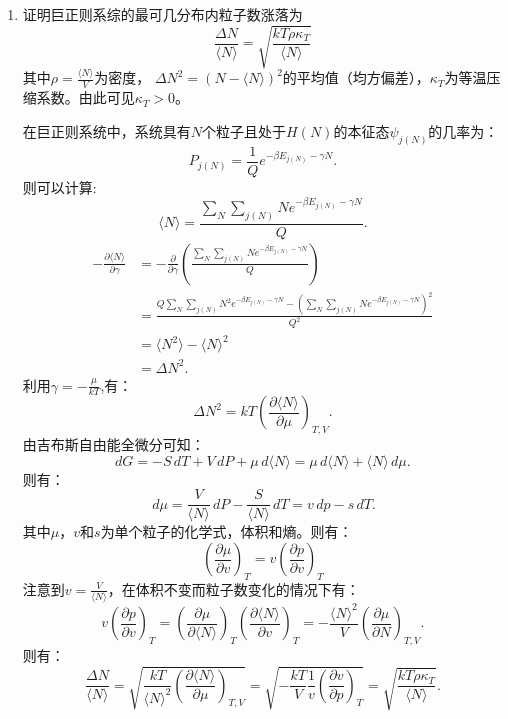 \documentclass[reqno,a4paper,12pt]{amsart}
\begin{document}
\begin{enumerate}[1]
	\item 证明巨正则系综的最可几分布内粒子数涨落为
	\[
		\frac{\Delta N}{\langle N \rangle} = \sqrt{\frac{kT\rho \kappa_T}{\langle N \rangle}}
	\]
	其中$\rho = \frac{\langle N \rangle}{V}$为密度， $\Delta N^2 = (N - \langle N \rangle)^2$的平均值（均方偏差），$\kappa_T$为等温压缩系数。由此可见$\kappa_T > 0$。
	\begin{tcolorbox}[breakable, colback = black!5!white, colframe = black]
	在巨正则系统中，系统具有$N$个粒子且处于$H(N)$的本征态$\psi_{j(N)}$的几率为：
	\[
		P_{j(N)} = \frac{1}{Q}e^{-\beta E_{j(N)} - \gamma N}.
	\]
	则可以计算:
	\[
		\langle N \rangle = \frac{\sum_N \sum_{j(N)} Ne^{-\beta E_{j(N)} - \gamma N}}{Q}.
	\]
	\begin{align*}
		-\frac{\partial \langle N \rangle}{\partial \gamma} &= -\frac{\partial }{\partial \gamma}\left( \frac{\sum_{N}\sum_{j(N)} Ne^{-\beta E_{j(N)} - \gamma N}}{Q} \right) \\
		&= \frac{Q\sum_N \sum_{j(N)} N^2e^{-\beta E_{j(N)} - \gamma N} - \left( \sum_N\sum_{j(N)} N e^{-\beta E_{j(N)} - \gamma N} \right)^2}{Q^2} \\
		&= \langle N^2 \rangle - \langle N \rangle^2 \\
		&= \Delta N^2.
	\end{align*}
	利用$\gamma = -\frac{\mu}{kT}$,有：
	\[
		\Delta N^2 = kT \left( \frac{\partial \langle N \rangle}{\partial \mu} \right)_{T,V}.
	\]
	由吉布斯自由能全微分可知：
	\[
		dG = -S\,dT + V\,dP + \mu\,d\langle N \rangle = \mu\,d\langle N \rangle + \langle N \rangle \,d\mu.
	\]
	则有：
	\[
		\,d\mu = \frac{V}{\langle N \rangle}\,dP - \frac{S}{\langle N \rangle}\,dT = v\,dp - s\,dT.
	\]
	其中$\mu$，$v$和$s$为单个粒子的化学式，体积和熵。则有：
	\[
		\left( \frac{\partial \mu}{\partial v} \right)_T = v \left( \frac{\partial p}{\partial v} \right)_T
	\]
	注意到$v = \frac{V}{\langle N \rangle}$，在体积不变而粒子数变化的情况下有：
	\[
		v\left( \frac{\partial p}{\partial v} \right)_T = \left( \frac{\partial \mu}{\partial \langle N \rangle} \right)_T \left( \frac{\partial \langle N \rangle}{\partial v} \right)_T = -\frac{\langle N \rangle^2}{V} \left( \frac{\partial \mu}{\partial N} \right)_{T,V}.
	\]
	则有：
	\[
		\frac{\Delta N}{\langle N \rangle} = \sqrt{\frac{kT}{\langle N \rangle^2} \left( \frac{\partial \langle N \rangle}{\partial \mu} \right)_{T,V}} = \sqrt{-\frac{kT}{V}\frac{1}{v}\left( \frac{\partial v}{\partial p} \right)_T} = \sqrt{\frac{kT\rho\kappa_T}{\langle N \rangle}}.
	\]
	\end{tcolorbox}
\end{enumerate}
\end{document}
